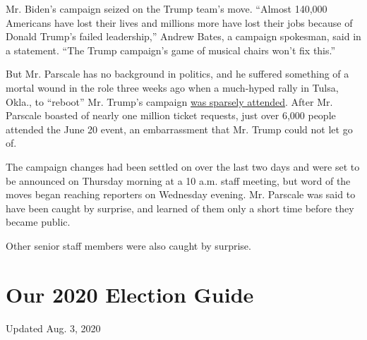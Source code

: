 Mr. Biden's campaign seized on the Trump team's move. ``Almost 140,000
Americans have lost their lives and millions more have lost their jobs
because of Donald Trump's failed leadership,'' Andrew Bates, a campaign
spokesman, said in a statement. ``The Trump campaign's game of musical
chairs won't fix this.''

But Mr. Parscale has no background in politics, and he suffered
something of a mortal wound in the role three weeks ago when a
much-hyped rally in Tulsa, Okla., to ``reboot'' Mr. Trump's campaign
\href{https://www.nytimes3xbfgragh.onion/2020/06/20/us/politics/tulsa-trump-rally.html}{was
sparsely attended}. After Mr. Parscale boasted of nearly one million
ticket requests, just over 6,000 people attended the June 20 event, an
embarrassment that Mr. Trump could not let go of.

The campaign changes had been settled on over the last two days and were
set to be announced on Thursday morning at a 10 a.m. staff meeting, but
word of the moves began reaching reporters on Wednesday evening. Mr.
Parscale was said to have been caught by surprise, and learned of them
only a short time before they became public.

Other senior staff members were also caught by surprise.

\hypertarget{our-2020-election-guide}{%
\section{Our 2020 Election Guide}\label{our-2020-election-guide}}

Updated Aug. 3, 2020

